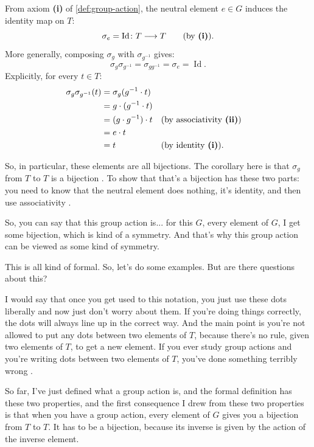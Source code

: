 \begin{content}
From axiom \textbf{(i)} of \cref{def:group-action}, the neutral element $e \in G$ induces the identity map on $T$:
\[
\sigma_e = \operatorname{Id} \colon T \longrightarrow T \qquad \text{(by \textbf{(i)})}.
\]
More generally, composing $\sigma_g$ with $\sigma_{g^{-1}}$ gives:
\[
\sigma_g \sigma_{g^{-1}} = \sigma_{g g^{-1}} = \sigma_e = \operatorname{Id}.
\]
Explicitly, for every $t \in T$:
\begin{align*}
\sigma_g \sigma_{g^{-1}}(t) &= \sigma_g(g^{-1} \cdot t) \\
&= g \cdot (g^{-1} \cdot t) \\
&= (g \cdot g^{-1}) \cdot t && \text{(by associativity \textbf{(ii)})} \\
&= e \cdot t \\
&= t && \text{(by identity \textbf{(i)})}.
\end{align*}
\end{content}

\begin{speech}[00:51:35 - 00:52:54]
So, in particular, these elements are all bijections. The corollary here is that $\sigma_g$ from $T$ to $T$ is a bijection . To show that that's a bijection has these two parts: you need to know that the neutral element does nothing, it's identity, and then use associativity .

So, you can say that this group action is... for this $G$, every element of $G$, I get some bijection, which is kind of a symmetry. And that's why this group action can be viewed as some kind of symmetry.

This is all kind of formal. So, let's do some examples. But are there questions about this?

I would say that once you get used to this notation, you just use these dots liberally and now just don't worry about them. If you're doing things correctly, the dots will always line up in the correct way. And the main point is you're not allowed to put any dots between two elements of $T$, because there's no rule, given two elements of $T$, to get a new element. If you ever study group actions and you're writing dots between two elements of $T$, you've done something terribly wrong .

So far, I've just defined what a group action is, and the formal definition has these two properties, and the first consequence I drew from these two properties is that when you have a group action, every element of $G$ gives you a bijection from $T$ to $T$. It has to be a bijection, because its inverse is given by the action of the inverse element.
\end{speech}

